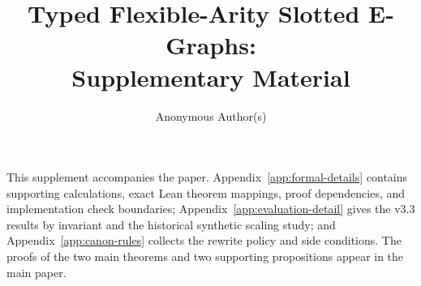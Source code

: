 \documentclass[runningheads]{llncs}
\title{Typed Flexible-Arity Slotted E-Graphs:\\
Supplementary Material}
\author{Anonymous Author(s)}
\institute{}
\begin{document}
\raggedbottom
\maketitle
This supplement accompanies the paper. Appendix~\ref{app:formal-details}
contains supporting calculations, exact Lean theorem mappings, proof
dependencies, and implementation check boundaries;
Appendix~\ref{app:evaluation-detail} gives the v3.3 results by invariant and the historical synthetic scaling study;
and Appendix~\ref{app:canon-rules} collects the rewrite policy and side
conditions. The proofs of the two main theorems and two supporting propositions
appear in the main paper.
\appendix

\clearpage

\clearpage

\end{document}
